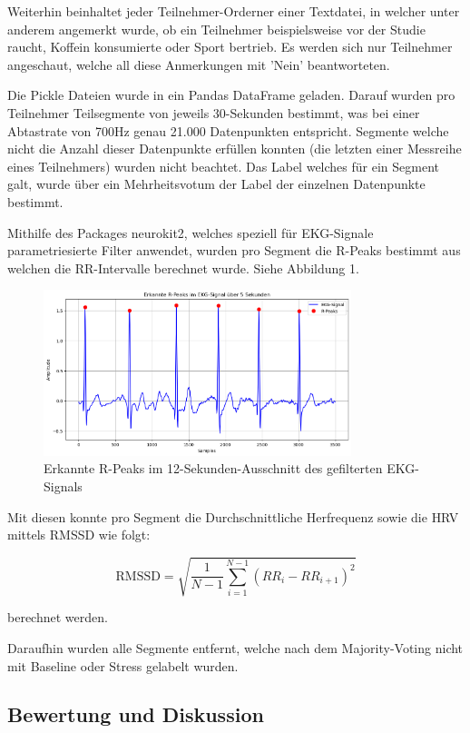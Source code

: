 Weiterhin beinhaltet jeder Teilnehmer-Orderner einer Textdatei, in welcher unter anderem angemerkt wurde, ob ein Teilnehmer beispielsweise vor der Studie raucht, Koffein konsumierte oder Sport bertrieb. Es werden sich nur Teilnehmer angeschaut, welche all diese Anmerkungen mit 'Nein' beantworteten.

Die Pickle Dateien wurde in ein Pandas DataFrame geladen. Darauf wurden pro Teilnehmer Teilsegmente von jeweils 30-Sekunden bestimmt, was bei einer Abtastrate von 700Hz genau 21.000 Datenpunkten entspricht. Segmente welche nicht die Anzahl dieser Datenpunkte erfüllen konnten (die letzten einer Messreihe eines Teilnehmers) wurden nicht beachtet. 
Das Label welches für ein Segment galt, wurde über ein Mehrheitsvotum der Label der einzelnen Datenpunkte bestimmt. 

Mithilfe des Packages neurokit2, welches speziell für \ac{EKG}-Signale parametriesierte Filter anwendet, wurden pro Segment die R-Peaks bestimmt aus welchen die RR-Intervalle berechnet wurde. Siehe Abbildung 1.

\begin{figure}[ht]
    \centering
    \includegraphics[width=0.8\textwidth]{Bilder/EKG-Plot.png}
    \caption{Erkannte R-Peaks im 12-Sekunden-Ausschnitt des gefilterten EKG-Signals}
    \label{fig:ekg-peaks}
\end{figure}

Mit diesen konnte pro Segment die Durchschnittliche Herfrequenz sowie die \ac{HRV} mittels \ac{RMSSD} wie folgt:

\[
\text{RMSSD} = \sqrt{\frac{1}{N-1} \sum_{i=1}^{N-1} (RR_i - RR_{i+1})^2}
\]

berechnet werden.

Daraufhin wurden alle Segmente entfernt, welche nach dem Majority-Voting nicht mit Baseline oder Stress gelabelt wurden.

\subsection{Bewertung und Diskussion}

